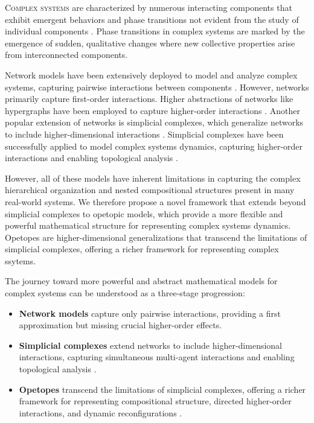 \lettrine[lines=2, findent=3pt, nindent=0pt]{C}{omplex systems} are characterized by numerous interacting components that exhibit emergent behaviors and phase transitions not evident from the study of individual components \citep{mitchell2009complexity}. Phase transitions in complex systems are marked by the emergence of sudden, qualitative changes where new collective properties arise from interconnected components.

Network models have been extensively deployed to model and analyze complex systems, capturing pairwise interactions between components \citep{newman2003structure, boccaletti2006complex}. However, networks primarily capture first-order interactions. Higher abstractions of networks like hypergraphs have been employed to capture higher-order interactions \citep{battiston2020networks}. Another popular extension of networks is simplicial complexes, which generalize networks to include higher-dimensional interactions \citep{petri2014homological}. Simplicial complexes have been successfully applied to model complex systems dynamics, capturing higher-order interactions and enabling topological analysis \citep{petri2014homological, giusti2016two, sizemore2018importance}.

However, all of these models have inherent limitations in capturing the complex hierarchical organization and nested compositional structures present in many real-world systems. We therefore propose a novel framework that extends beyond simplicial complexes to opetopic models, which provide a more flexible and powerful mathematical structure for representing complex systems dynamics. Opetopes are higher-dimensional generalizations that transcend the limitations of simplicial complexes, offering a richer framework for representing complex ssytems.

The journey toward more powerful and abstract mathematical models for complex systems can be understood as a three-stage progression:

\begin{itemize}[leftmargin=*]
  \item \textbf{Network models} capture only pairwise interactions, providing a first approximation but missing crucial higher-order effects.

  \item \textbf{Simplicial complexes} extend networks to include higher-dimensional interactions, capturing simultaneous multi-agent interactions and enabling topological analysis \citep{battiston2020networks, petri2014homological}.

  \item \textbf{Opetopes} transcend the limitations of simplicial complexes, offering a richer framework for representing compositional structure, directed higher-order interactions, and dynamic reconfigurations \citep{baez2020network, baas2009higher}.
\end{itemize}

